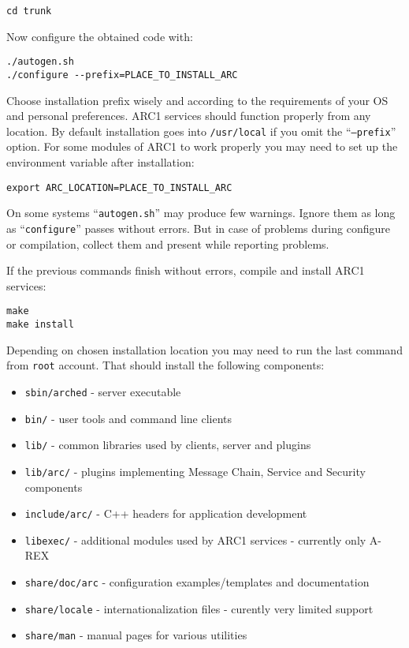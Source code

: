 \documentclass{article}                            %
\begin{document}
\begin{lstlisting}
cd trunk
\end{lstlisting}

Now configure the obtained code with:

\begin{lstlisting}
./autogen.sh
./configure --prefix=PLACE_TO_INSTALL_ARC
\end{lstlisting}

Choose installation prefix wisely and according to the requirements of your OS
and personal preferences. ARC1 services should function properly from any
location. By default installation goes into \texttt{/usr/local} if you omit the
``\texttt{--prefix}'' option. For some modules of ARC1 to work properly you may
need to set up the environment variable after installation:

\begin{lstlisting}
export ARC_LOCATION=PLACE_TO_INSTALL_ARC
\end{lstlisting}

On some systems ``\texttt{autogen.sh}'' may produce few warnings. Ignore them as
long as ``\texttt{configure}'' passes without errors. But in case of problems
during configure or compilation, collect them and present while reporting
problems.

If the previous commands finish without errors, compile and install ARC1
services:

\begin{lstlisting}
make
make install
\end{lstlisting}

Depending on chosen installation location you may need to run the last command
from \texttt{root} account. That should install the following components:

\begin{itemize}
\item \texttt{sbin/arched} - server executable
\item \texttt{bin/} - user tools and command line clients
\item \texttt{lib/} - common libraries used by clients, server and plugins
\item \texttt{lib/arc/} - plugins implementing Message Chain, Service and
Security components
\item \texttt{include/arc/} - C++ headers for application development
\item \texttt{libexec/} - additional modules used by ARC1 services - currently
only A-REX
\item \texttt{share/doc/arc} - configuration examples/templates and
documentation
\item \texttt{share/locale} - internationalization files - curently very limited
support
\item \texttt{share/man} - manual pages for various utilities
\end{itemize}
\end{document}
